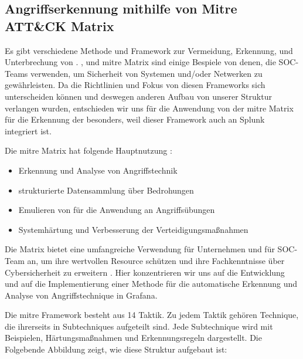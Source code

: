 \subsection{Angriffserkennung mithilfe von Mitre ATT\&CK Matrix\textregistered}
Es gibt verschiedene Methode und Framework zur Vermeidung, Erkennung, und Unterbrechung von . ,  und \gls{mitre} Matrix sind einige Bespiele von denen, die \gls{SOC}-Teams verwenden, um Sicherheit von Systemen und/oder Netwerken zu gewährleisten. Da die Richtlinien und Fokus von diesen Frameworks sich unterscheiden können und deswegen anderen Aufbau von unserer Struktur verlangen wurden, entschieden wir uns für die Anwendung von der \gls{mitre} Matrix für die Erkennung der  besonders, weil dieser Framework auch an Splunk integriert ist.

\newpage
Die \gls{mitre} Matrix hat folgende Hauptnutzung \citep{Mitre_Started}:

\begin{itemize}[noitemsep]
   \item Erkennung und Analyse von Angriffstechnik
   \item	strukturierte Datensammlung über Bedrohungen
   \item	Emulieren von  für die Anwendung an Angriffsübungen
   \item	Systemhärtung und Verbesserung der Verteidigungsmaßnahmen
\end{itemize}

Die Matrix bietet eine umfangreiche Verwendung für Unternehmen und für \gls{SOC}-Team an, um ihre wertvollen Resource schützen und ihre Fachkenntnisse über \gls{Cybersicherheit} zu erweitern \citep{Hazel_howtousemitre}. Hier konzentrieren wir uns auf die Entwicklung und auf die Implementierung einer Methode für die automatische Erkennung und Analyse von Angriffstechnique in Grafana.

Die \gls{mitre} Framework besteht aus 14 Taktik. Zu jedem Taktik gehören Technique, die ihrerseits in Subtechniques aufgeteilt sind. Jede Subtechnique wird mit Beispielen, Härtungsmaßnahmen und Erkennungsregeln dargestellt. Die Folgebende Abbildung zeigt, wie diese Struktur aufgebaut ist: 

